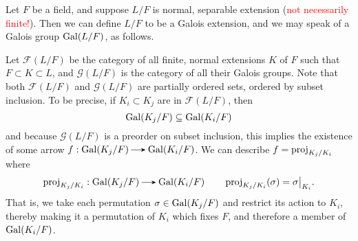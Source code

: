     \begin{example}
        Let $F$ be a field, and suppose $L/F$ is normal, separable
        extension (\textcolor{Red}{not necessarily finite!}).
        Then we can define $L/F$ to be a Galois extension,
        and we may speak of a Galois group $\operatorname{\mathrm{Gal}}(L/F)$, as follows.

        Let $\mathcal{F}(L/F)$ be the category of all
        finite, normal extensions $K$ of $F$ such that $F \subset K
        \subset L$, and $\mathcal{G}(L/F)$ is the category of all
        their Galois groups. Note that both $\mathcal{F}(L/F)$ and 
        $\mathcal{G}(L/F)$ are partially ordered sets, ordered by subset inclusion. 
        To be precise, if $K_i \subset K_j$ are in $\mathcal{F}(L/F)$,
        then 
        \[
            \operatorname{\mathrm{Gal}}(K_j/F) \subseteq \operatorname{\mathrm{Gal}}(K_i/F)
        \]
        and because $\mathcal{G}(L/F)$ is a preorder on subset
        inclusion, this implies the existence of some arrow $f:
        \gal(K_j/F) \to \gal(K_i/F)$. We can describe 
        $f = \operatorname{\mathrm{proj}}_{K_j/K_i}$ where 
        \[
            \proj_{K_j/K_i}: \gal(K_j/F) \to \gal(K_i/F) \qquad \proj_{K_j/K_i}(\sigma) = \sigma\big|_{K_i}.  
        \]
        That is, we take each permutation $\sigma \in \operatorname{\mathrm{Gal}}(K_j/F)$
        and restrict its action to $K_i$, thereby making it a
        permutation of $K_i$ which fixes $F$, 
        and therefore a member of $\operatorname{\mathrm{Gal}}(K_i/F)$. 


\end{example}
